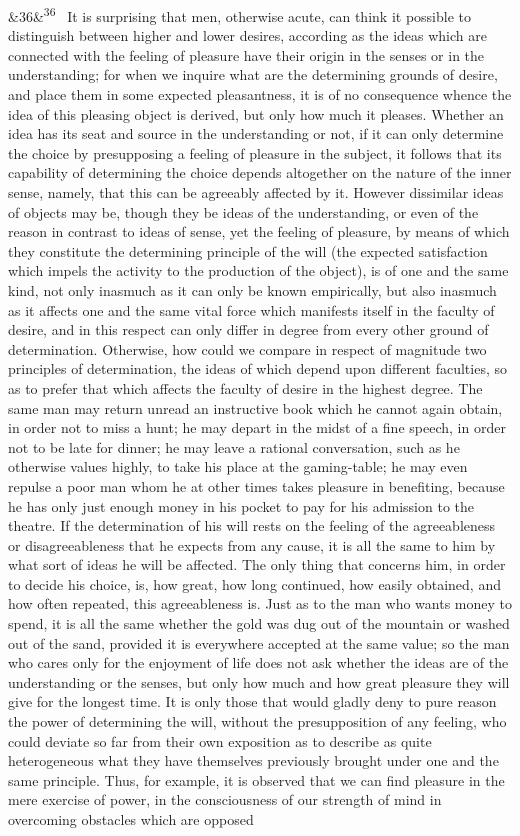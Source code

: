 \documentclass[12pt]{article}
\newcommand{\para}[1][]{\par\noindent\ifx&#1&\else\textsuperscript{\footnotesize #1}~\fi}
\begin{document}
\para[36] It is surprising that men, otherwise acute, can think it possible to distinguish between higher and lower desires, according as the ideas which are connected with the feeling of pleasure have their origin in the senses or in the understanding; for when we inquire what are the determining grounds of desire, and place them in some expected pleasantness, it is of no consequence whence the idea of this pleasing object is derived, but only how much it pleases. Whether an idea has its seat and source in the understanding or not, if it can only determine the choice by presupposing a feeling of pleasure in the subject, it follows that its capability of determining the choice depends altogether on the nature of the inner sense, namely, that this can be agreeably affected by it. However dissimilar ideas of objects may be, though they be ideas of the understanding, or even of the reason in contrast to ideas of sense, yet the feeling of pleasure, by means of which they constitute the determining principle of the will (the expected satisfaction which impels the activity to the production of the object), is of one and the same kind, not only inasmuch as it can only be known empirically, but also inasmuch as it affects one and the same vital force which manifests itself in the faculty of desire, and in this respect can only differ in degree from every other ground of determination. Otherwise, how could we compare in respect of magnitude two principles of determination, the ideas of which depend upon different faculties, so as to prefer that which affects the faculty of desire in the highest degree. The same man may return unread an instructive book which he cannot again obtain, in order not to miss a hunt; he may depart in the midst of a fine speech, in order not to be late for dinner; he may leave a rational conversation, such as he otherwise values highly, to take his place at the gaming-table; he may even repulse a poor man whom he at other times takes pleasure in benefiting, because he has only just enough money in his pocket to pay for his admission to the theatre. If the determination of his will rests on the feeling of the agreeableness or disagreeableness that he expects from any cause, it is all the same to him by what sort of ideas he will be affected. The only thing that concerns him, in order to decide his choice, is, how great, how long continued, how easily obtained, and how often repeated, this agreeableness is. Just as to the man who wants money to spend, it is all the same whether the gold was dug out of the mountain or washed out of the sand, provided it is everywhere accepted at the same value; so the man who cares only for the enjoyment of life does not ask whether the ideas are of the understanding or the senses, but only how much and how great pleasure they will give for the longest time. It is only those that would gladly deny to pure reason the power of determining the will, without the presupposition of any feeling, who could deviate so far from their own exposition as to describe as quite heterogeneous what they have themselves previously brought under one and the same principle. Thus, for example, it is observed that we can find pleasure in the mere exercise of power, in the consciousness of our strength of mind in overcoming obstacles which are opposed 
\end{document}
